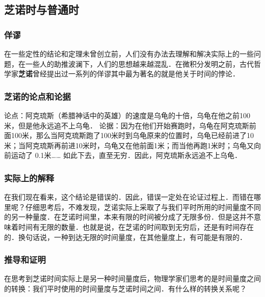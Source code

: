 
\begin{issues}

\end{issues}

\subsection{芝诺时与普通时}

\subsubsection{佯谬}
在一些定性的结论和定理未曾创立前，人们没有办法去理解和解决实际上的一些问题，在一些人的助推波澜下，人们的思想越来越混乱．在微积分发明之前，古代哲学家\textbf{芝诺}曾经提出过一系列的佯谬其中最为著名的就是他关于时间的悖论．

\subsubsection{芝诺的论点和论据}
论点：阿克琉斯（希腊神话中的英雄）的速度是乌龟的十倍，乌龟在他之前100米，但是他永远追不上乌龟．
论据：因为在他们开始赛跑时，乌龟在阿克琉斯前面100米，那么当阿克琉斯跑了100米时到乌龟原来的位置时，乌龟已经前进了10米；当阿克琉斯再前进10米时，乌龟又在他前面1米；而当他再跑1米时；乌龟又向前运动了  0.1米…… 如此下去，直至无穷．因此，阿克琉斯永远追不上乌龟．

\subsubsection{实际上的解释}
在我们现在看来，这个结论是错误的．因此，错误一定处在论证过程上．而错在哪里呢？仔细思考后，不难发现，芝诺实际上采取了与我们平时所用的时间量度不同的另一种量度．在芝诺时间里，本来有限的时间被分成了无限多份．但是这并不意味着时间有无限的数量．也就是说，在芝诺的时间取到无穷后，还是有时间存在的．换句话说，一种到达无限的时间量度，在其他量度上，有可能是有限的．

\subsubsection{推导和证明}
在思考到芝诺时间实际上是另一种时间量度后，物理学家们思考的是时间量度之间的转换：我们平时使用的时间量度与芝诺时间之间．有什么样的转换关系呢？

